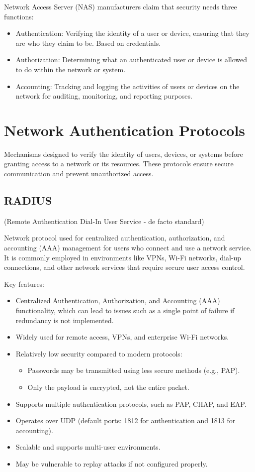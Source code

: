 Network Access Server (NAS) manufacturers claim that security needs three functions:
\begin{itemize}
    \item Authentication: Verifying the identity of a user or device, ensuring that they are who they claim to be. Based on credentials.
    \item Authorization: Determining what an authenticated user or device is allowed to do within the network or system.
    \item Accounting: Tracking and logging the activities of users or devices on the network for auditing, monitoring, and reporting purposes.
\end{itemize}

\section{Network Authentication Protocols}
Mechanisms designed to verify the identity of users, devices, or systems before granting access to a network or its resources. These protocols ensure secure communication and prevent unauthorized access.

\subsection{RADIUS}
\begin{center}
    (Remote Authentication Dial-In User Service - de facto standard)
\end{center}
Network protocol used for centralized authentication, authorization, and accounting (AAA) management for users who connect and use a network service. It is commonly employed in environments like VPNs, Wi-Fi networks, dial-up connections, and other network services that require secure user access control.

Key features:
\begin{itemize}
    \item Centralized Authentication, Authorization, and Accounting (AAA) functionality, which can lead to issues such as a single point of failure if redundancy is not implemented.    
    \item Widely used for remote access, VPNs, and enterprise Wi-Fi networks.
    \item Relatively low security compared to modern protocols:
    \begin{itemize}
        \item Passwords may be transmitted using less secure methods (e.g., PAP).
        \item Only the payload is encrypted, not the entire packet.
    \end{itemize}
    \item Supports multiple authentication protocols, such as PAP, CHAP, and EAP.
    \item Operates over UDP (default ports: 1812 for authentication and 1813 for accounting).
    \item Scalable and supports multi-user environments.
    \item May be vulnerable to replay attacks if not configured properly.
\end{itemize}

